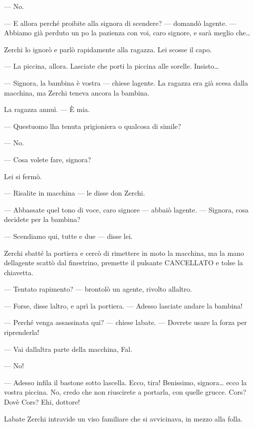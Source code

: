 --- No.

--- E allora perché proibite alla signora di scendere? --- domandò
l\textquotesingle agente. --- Abbiamo già perduto un
po\textquotesingle{} la pazienza con voi, caro signore, e sarà meglio
che\ldots{}

Zerchi lo ignorò e parlò rapidamente alla ragazza. Lei scosse il capo.

--- La piccina, allora. Lasciate che porti la piccina alle sorelle.
Insisto\ldots{}

--- Signora, la bambina è vostra --- chiese l\textquotesingle agente. La
ragazza era già scesa dalla macchina, ma Zerchi teneva ancora la
bambina.

La ragazza annuì. --- È mia.

--- Quest\textquotesingle uomo l\textquotesingle ha tenuta prigioniera o
qualcosa di simile?

--- No.

--- Cosa volete fare, signora?

Lei si fermò.

--- Risalite in macchina --- le disse don Zerchi.

--- Abbassate quel tono di voce, caro signore --- abbaiò
l\textquotesingle agente. --- Signora, cosa decidete per la bambina?

--- Scendiamo qui, tutte e due --- disse lei.

Zerchi sbatté la portiera e cercò di rimettere in moto la macchina, ma
la mano dell\textquotesingle agente scattò dal finestrino, premette il
pulsante CANCELLATO e tolse la chiavetta.

--- Tentato rapimento? --- brontolò un agente, rivolto
all\textquotesingle altro.

--- Forse, disse l\textquotesingle altro, e aprì la portiera. --- Adesso
lasciate andare la bambina!

--- Perché venga assassinata qui? --- chiese l\textquotesingle abate.
--- Dovrete usare la forza per riprenderla!

--- Vai dall\textquotesingle altra parte della macchina, Fal.

--- No!

--- Adesso infila il bastone sotto l\textquotesingle ascella. Ecco,
tira! Benissimo, signora\ldots{} ecco la vostra piccina. No, credo che
non riuscirete a portarla, con quelle grucce. Cors?
Dov\textquotesingle è Cors? Ehi, dottore!

L\textquotesingle abate Zerchi intravide un viso familiare che si
avvicinava, in mezzo alla folla.

